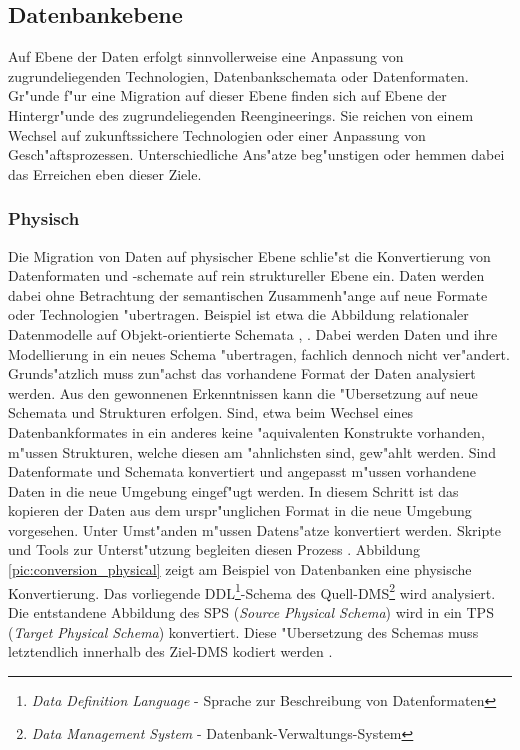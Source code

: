 \subsection{Datenbankebene}

Auf Ebene der Daten erfolgt sinnvollerweise eine Anpassung von zugrundeliegenden Technologien, Datenbankschemata oder Datenformaten. Gr"unde f"ur eine Migration auf dieser Ebene finden sich auf Ebene der Hintergr"unde des zugrundeliegenden Reengineerings. Sie reichen von einem Wechsel auf zukunftssichere Technologien oder einer Anpassung von Gesch"aftsprozessen. Unterschiedliche Ans"atze beg"unstigen oder hemmen dabei das Erreichen eben dieser Ziele. 

\subsubsection{Physisch}

Die Migration von Daten auf physischer Ebene schlie"st die Konvertierung von Datenformaten und -schemate auf rein struktureller Ebene ein. Daten werden dabei ohne Betrachtung der semantischen Zusammenh"ange auf neue Formate oder Technologien "ubertragen. Beispiel ist etwa die Abbildung relationaler Datenmodelle auf Objekt-orientierte Schemata \citep{alhajj-2001}, \citep{behm-1997}. Dabei werden Daten und ihre Modellierung in ein neues Schema "ubertragen, fachlich dennoch nicht ver"andert.
\lb
Grunds"atzlich muss zun"achst das vorhandene Format der Daten analysiert werden. Aus den gewonnenen Erkenntnissen kann die "Ubersetzung auf neue Schemata und Strukturen erfolgen. Sind, etwa beim Wechsel eines Datenbankformates in ein anderes keine "aquivalenten Konstrukte vorhanden, m"ussen Strukturen, welche diesen am "ahnlichsten sind, gew"ahlt werden. 
\lb
Sind Datenformate und Schemata konvertiert und angepasst m"ussen vorhandene Daten in die neue Umgebung eingef"ugt werden. In diesem Schritt ist das kopieren der Daten aus dem urspr"unglichen Format in die neue Umgebung vorgesehen. Unter Umst"anden m"ussen Datens"atze konvertiert werden. Skripte und Tools zur Unterst"utzung begleiten diesen Prozess \citep{henrard-2002}.
\lb
Abbildung \ref{pic:conversion_physical} zeigt am Beispiel von Datenbanken eine physische Konvertierung. Das vorliegende DDL\footnote{\textit{Data Definition Language} - Sprache zur Beschreibung von Datenformaten}-Schema des Quell-DMS\footnote{\textit{Data Management System} - Datenbank-Verwaltungs-System} wird analysiert. Die entstandene Abbildung des SPS (\textit{Source Physical Schema}) wird in ein TPS (\textit{Target Physical Schema}) konvertiert. Diese "Ubersetzung des Schemas muss letztendlich innerhalb des Ziel-DMS kodiert werden \citep{henrard-2002}.

